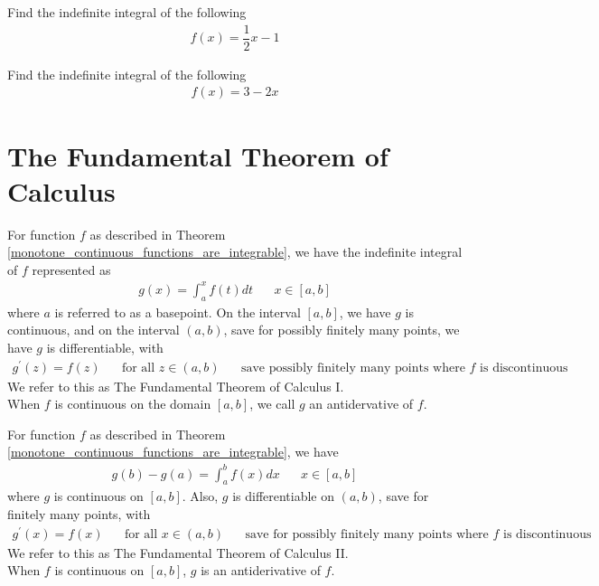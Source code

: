 \begin{exercise}
Find the indefinite integral of the following
\begin{align*}
    f(x) = \dfrac{1}{2}x - 1
\end{align*}
\end{exercise}

\begin{exercise}
Find the indefinite integral of the following
\begin{align*}
    f(x) = 3 - 2x
\end{align*}
\end{exercise}

\newpage
\section{The Fundamental Theorem of Calculus}

\begin{theorem}
For function $f$ as described in Theorem \ref{monotone_continuous_functions_are_integrable}, we have the indefinite integral of $f$ represented as
\begin{align*}
    g(x) = \int_{a}^{x} f(t) dt \hspace{20pt} x \in [a, b]
\end{align*}
where $a$ is referred to as a basepoint. On the interval $[a, b]$, we have $g$ is continuous, and on the interval $(a, b)$, save for possibly finitely many points, we have $g$ is differentiable, with
\begin{align*}
    g^{'}(z) = f(z) \hspace{20pt} \text{for all} \hspace{4pt} z \in (a, b) \hspace{20pt} \text{save possibly finitely many points where $f$ is discontinuous}
\end{align*}
We refer to this as The Fundamental Theorem of Calculus I.\\[1ex]
When $f$ is continuous on the domain $[a, b]$, we call $g$ an antidervative of $f$. \label{FTC_1}
\end{theorem}

\begin{theorem}
For function $f$ as described in Theorem \ref{monotone_continuous_functions_are_integrable}, we have 
\begin{align*}
    g(b) - g(a) = \int_{a}^{b} f(x) dx \hspace{20pt} x \in [a, b]
\end{align*}
where $g$ is continuous on $[a, b]$. Also, $g$ is differentiable on $(a, b)$, save for finitely many points, with
\begin{align*}
    g^{'}(x) = f(x) \hspace{20pt} \text{for all} \hspace{4pt} x \in (a, b) \hspace{20pt} \text{save for possibly finitely many points where $f$ is discontinuous}
\end{align*}
We refer to this as The Fundamental Theorem of Calculus II.\\[1ex]
When $f$ is continuous on $[a, b]$, $g$ is an antiderivative of $f$.
\end{theorem}

